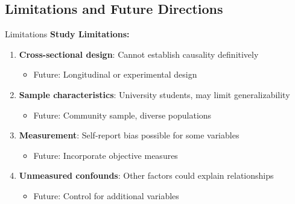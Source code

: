 \documentclass[aspectratio=169,11pt]{beamer}
\begin{document}
\subsection{Limitations and Future Directions}

\begin{frame}{Limitations}
  \textbf{Study Limitations:}
  \begin{enumerate}
    \item \textbf{Cross-sectional design}: Cannot establish causality definitively
    \begin{itemize}
      \item Future: Longitudinal or experimental design
    \end{itemize}
    
    \item \textbf{Sample characteristics}: University students, may limit generalizability
    \begin{itemize}
      \item Future: Community sample, diverse populations
    \end{itemize}
    
    \item \textbf{Measurement}: Self-report bias possible for some variables
    \begin{itemize}
      \item Future: Incorporate objective measures
    \end{itemize}
    
    \item \textbf{Unmeasured confounds}: Other factors could explain relationships
    \begin{itemize}
      \item Future: Control for additional variables
    \end{itemize}
  \end{enumerate}
\end{frame}
\end{document}
